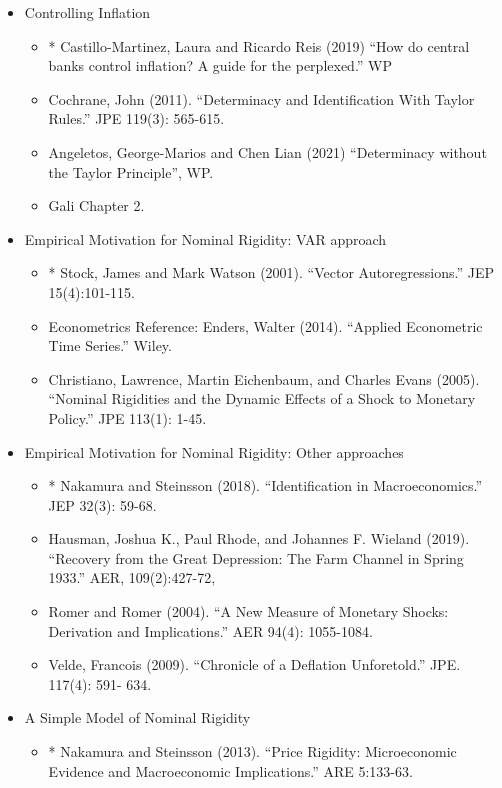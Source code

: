 \documentclass[12pt]{article}
\begin{document}
\begin{itemize}
\begin{itemize}
	\end{itemize}
	\item Controlling Inflation
	\begin{itemize}
		\item* Castillo-Martinez, Laura and Ricardo Reis (2019) ``How do central banks control inflation? A guide for the perplexed.'' WP
		\item Cochrane, John (2011). ``Determinacy and Identification With Taylor Rules.'' JPE 119(3): 565-615.
		\item Angeletos, George-Marios and Chen Lian (2021) ``Determinacy without the Taylor Principle'', WP.
		\item Gali Chapter 2.
	\end{itemize}
	\item Empirical Motivation for Nominal Rigidity: VAR approach
	\begin{itemize}
		\item* Stock, James and Mark Watson (2001). ``Vector Autoregressions.'' JEP 15(4):101-115.
		\item Econometrics Reference: Enders, Walter (2014). ``Applied Econometric Time Series.'' Wiley.
		\item Christiano, Lawrence, Martin Eichenbaum, and Charles Evans (2005). ``Nominal Rigidities and the Dynamic Effects of a Shock to Monetary Policy.'' JPE 113(1): 1-45.
	\end{itemize}
	\item Empirical Motivation for Nominal Rigidity: Other approaches
	\begin{itemize}
		\item* Nakamura and Steinsson (2018). ``Identification in Macroeconomics.'' JEP 32(3): 59-68.
		\item Hausman, Joshua K., Paul Rhode, and Johannes F. Wieland (2019). ``Recovery from the Great Depression: The Farm Channel in Spring 1933.'' AER, 109(2):427-72,
		\item Romer and Romer (2004). ``A New Measure of Monetary Shocks: Derivation and Implications.'' AER 94(4): 1055-1084.
		\item Velde, Francois (2009). ``Chronicle of a Deflation Unforetold.'' JPE. 117(4): 591- 634.
	\end{itemize}
	\item A Simple Model of Nominal Rigidity
	\begin{itemize}
		\item* Nakamura and Steinsson (2013). ``Price Rigidity: Microeconomic Evidence and Macroeconomic Implications.'' ARE 5:133-63.

\end{itemize}
\end{itemize}
\end{document}
